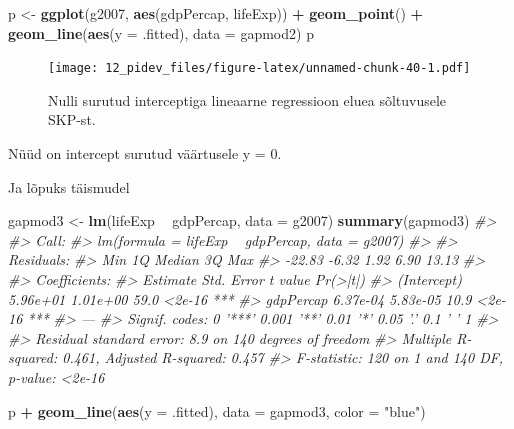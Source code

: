 \documentclass[]{book}
\newenvironment{Shaded}{\begin{snugshade}}{\end{snugshade}}
\newcommand{\CommentTok}[1]{\textcolor[rgb]{0.56,0.35,0.01}{\textit{#1}}}
\newcommand{\DataTypeTok}[1]{\textcolor[rgb]{0.13,0.29,0.53}{#1}}
\newcommand{\KeywordTok}[1]{\textcolor[rgb]{0.13,0.29,0.53}{\textbf{#1}}}
\newcommand{\NormalTok}[1]{#1}
\newcommand{\OperatorTok}[1]{\textcolor[rgb]{0.81,0.36,0.00}{\textbf{#1}}}
\newcommand{\StringTok}[1]{\textcolor[rgb]{0.31,0.60,0.02}{#1}}
\begin{document}
\begin{Shaded}
\begin{Highlighting}[]
\NormalTok{p <-}\StringTok{ }\KeywordTok{ggplot}\NormalTok{(g2007, }\KeywordTok{aes}\NormalTok{(gdpPercap, lifeExp)) }\OperatorTok{+}
\StringTok{  }\KeywordTok{geom_point}\NormalTok{() }\OperatorTok{+}\StringTok{ }
\StringTok{  }\KeywordTok{geom_line}\NormalTok{(}\KeywordTok{aes}\NormalTok{(}\DataTypeTok{y =}\NormalTok{ .fitted), }\DataTypeTok{data =}\NormalTok{ gapmod2)}
\NormalTok{p}
\end{Highlighting}
\end{Shaded}

\begin{figure}
\centering
\texttt{[image: 12\_pidev\_files/figure-latex/unnamed-chunk-40-1.pdf]}
\caption{\label{fig:unnamed-chunk-40}Nulli surutud interceptiga lineaarne regressioon eluea sõltuvusele SKP-st.}
\end{figure}

Nüüd on intercept surutud väärtusele y = 0.

Ja lõpuks täismudel

\begin{Shaded}
\begin{Highlighting}[]
\NormalTok{gapmod3 <-}\StringTok{ }\KeywordTok{lm}\NormalTok{(lifeExp }\OperatorTok{~}\StringTok{ }\NormalTok{gdpPercap, }\DataTypeTok{data =}\NormalTok{ g2007)}
\KeywordTok{summary}\NormalTok{(gapmod3)}
\CommentTok{#> }
\CommentTok{#> Call:}
\CommentTok{#> lm(formula = lifeExp ~ gdpPercap, data = g2007)}
\CommentTok{#> }
\CommentTok{#> Residuals:}
\CommentTok{#>    Min     1Q Median     3Q    Max }
\CommentTok{#> -22.83  -6.32   1.92   6.90  13.13 }
\CommentTok{#> }
\CommentTok{#> Coefficients:}
\CommentTok{#>             Estimate Std. Error t value Pr(>|t|)    }
\CommentTok{#> (Intercept) 5.96e+01   1.01e+00    59.0   <2e-16 ***}
\CommentTok{#> gdpPercap   6.37e-04   5.83e-05    10.9   <2e-16 ***}
\CommentTok{#> ---}
\CommentTok{#> Signif. codes:  0 '***' 0.001 '**' 0.01 '*' 0.05 '.' 0.1 ' ' 1}
\CommentTok{#> }
\CommentTok{#> Residual standard error: 8.9 on 140 degrees of freedom}
\CommentTok{#> Multiple R-squared:  0.461,  Adjusted R-squared:  0.457 }
\CommentTok{#> F-statistic:  120 on 1 and 140 DF,  p-value: <2e-16}
\end{Highlighting}
\end{Shaded}

\begin{Shaded}
\begin{Highlighting}[]
\NormalTok{p }\OperatorTok{+}\StringTok{ }\KeywordTok{geom_line}\NormalTok{(}\KeywordTok{aes}\NormalTok{(}\DataTypeTok{y =}\NormalTok{ .fitted), }\DataTypeTok{data =}\NormalTok{ gapmod3, }\DataTypeTok{color =} \StringTok{"blue"}\NormalTok{)}
\end{Highlighting}
\end{Shaded}
\end{document}

